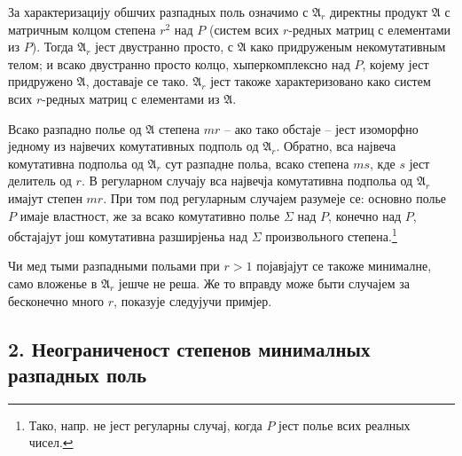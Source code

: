 ﻿\documentclass[11pt]{article}
\newcommand{\mA}{\mathfrak{A}}
\begin{document}
\noindent За характеризацију обшчих разпадных поль означимо с $\mA_r$ директны продукт $\mA$ с матричным колцом степена $r^2$ над $P$ (систем всих $r$-редных матриц с елементами из $P$). Тогда $\mA_r$ јест двустранно просто, с $\mA$ како придруженым некомутативным телом; и всако двустранно просто колцо, хыперкомплексно над $P$, којему јест придружено $\mA$, доставаје се тако. $\mA_r$ јест такоже характеризовано како систем всих $r$-редных матриц с елементами из $\mA$.

\medskip

\noindent Всако разпадно полье од $\mA$ степена $mr$ -- ако тако обстаје -- јест изоморфно једному из највечих комутативных подполь од $\mA_r$. Обратно, вса највеча комутативна подпольа од $\mA_r$ сут разпадне польа, всако степена $ms$, кде $s$ јест делитель од $r$. В регуларном случају вса највечја комутативна подпольа од $\mA_r$ имајут степен $mr$. При том под регуларным случајем разумеје се: основно полье $P$ имаје властност, же за всако комутативно полье $\Sigma$ над $P$, конечно над $P$, обстајајут још комутативна разширјеньа над $\Sigma$ произвольного степена.\footnote{Тако, напр. не јест регуларны случај, когда $P$ јест полье всих реалных чисел.}

\medskip

\noindent Чи мед тыми разпадными польами при $r>1$ појавјајут се такоже минималне, само вложенье в $\mA_r$ јешче не реша. Же то вправду може быти случајем за бесконечно много $r$, показује следујучи примјер.

\subsection*{2. Неограниченост степенов минималных разпадных поль}
\end{document}
